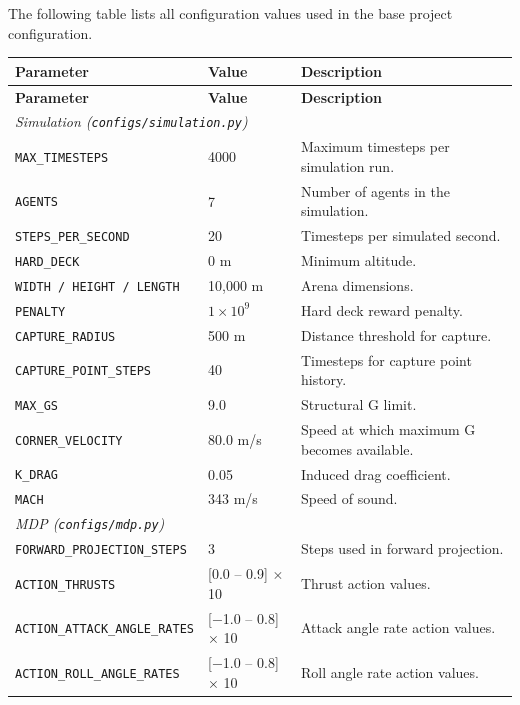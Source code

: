 \label{sec:B}

The following table lists all configuration values used in the base project configuration. 

\begin{longtable}{l@{\hspace{1cm}}l@{\hspace{1cm}}p{}}
\textbf{Parameter} & \textbf{Value} & \textbf{Description} \\
\midrule
\endfirsthead
\textbf{Parameter} & \textbf{Value} & \textbf{Description} \\
\midrule
\endhead
\multicolumn{3}{l}{\textit{Simulation (\texttt{configs/simulation.py})}} \\
\midrule
\texttt{MAX\_TIMESTEPS} & 4000 & Maximum timesteps per simulation run. \\
\texttt{AGENTS} & 7 & Number of agents in the simulation. \\
\texttt{STEPS\_PER\_SECOND} & 20 & Timesteps per simulated second. \\
\texttt{HARD\_DECK} & 0 m & Minimum altitude. \\
\texttt{WIDTH / HEIGHT / LENGTH} & 10,000 m & Arena dimensions. \\
\texttt{PENALTY} & $1 \times 10^9$ & Hard deck reward penalty. \\
\texttt{CAPTURE\_RADIUS} & 500 m & Distance threshold for capture. \\
\texttt{CAPTURE\_POINT\_STEPS} & 40 & Timesteps for capture point history. \\
\texttt{MAX\_GS} & 9.0 & Structural G limit. \\
\texttt{CORNER\_VELOCITY} & 80.0 m/s & Speed at which maximum G becomes available. \\
\texttt{K\_DRAG} & 0.05 & Induced drag coefficient. \\
\texttt{MACH} & 343 m/s & Speed of sound. \\
\midrule
\multicolumn{3}{l}{\textit{MDP (\texttt{configs/mdp.py})}} \\
\midrule
\texttt{FORWARD\_PROJECTION\_STEPS} & 3 & Steps used in forward projection. \\
\texttt{ACTION\_THRUSTS} & [0.0 -- 0.9] $\times$ 10 & Thrust action values. \\
\texttt{ACTION\_ATTACK\_ANGLE\_RATES} & [$-$1.0 -- 0.8] $\times$ 10 & Attack angle rate action values. \\
\texttt{ACTION\_ROLL\_ANGLE\_RATES} & [$-$1.0 -- 0.8] $\times$ 10 & Roll angle rate action values. \\

\end{longtable}
